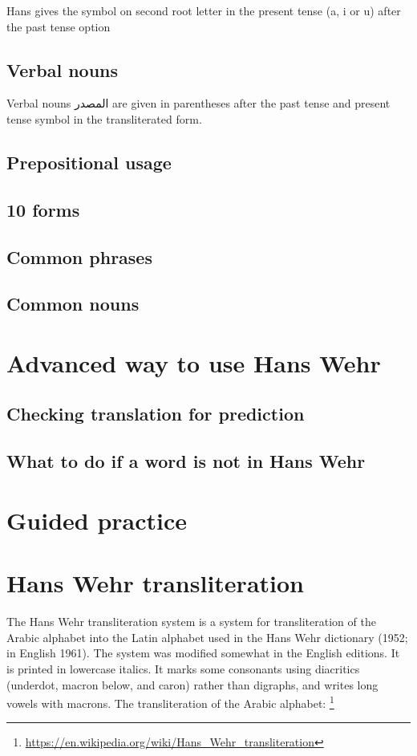 Hans gives the symbol on second root letter in the present tense (a, i or u) after the past tense option
\subsection{Verbal nouns} 
Verbal nouns \textarabic{المصدر} are given in parentheses after the past tense and present tense symbol in the transliterated form. 
\subsection{Prepositional usage}
\subsection{10 forms}
\subsection{Common phrases}
\subsection{Common nouns}


\section{Advanced way to use Hans Wehr}
\subsection{Checking translation for prediction}
\subsection{What to do if a word is not in Hans Wehr}
\section{Guided practice}


\section{Hans Wehr transliteration}
The Hans Wehr transliteration system is a system for transliteration of the Arabic alphabet into the Latin
alphabet used in the Hans Wehr dictionary (1952; in English 1961). The system was modified somewhat in the
English editions. It is printed in lowercase italics. It marks some consonants using diacritics (underdot, macron
below, and caron) rather than digraphs, and writes long vowels with macrons.
The transliteration of the Arabic alphabet:
\footnote{
	\url{https://en.wikipedia.org/wiki/Hans_Wehr_transliteration}}



